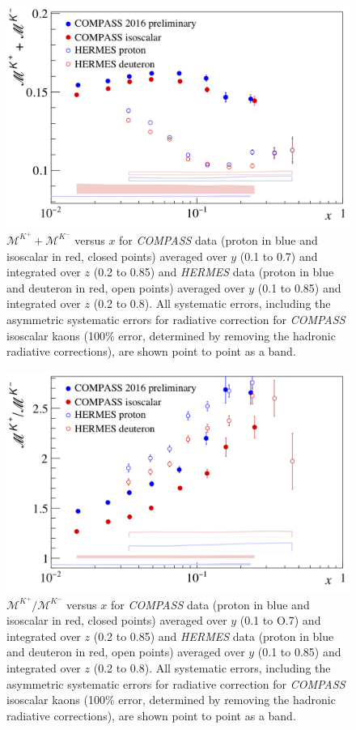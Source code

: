 \documentclass[letterpaper,12pt]{article}
\begin{document}
\begin{figure}[H]
	\centering
	\includegraphics[scale=0.55]{./gfx/Ks.png}
	\caption{$\mathscr{M}^{K^+}+\mathscr{M}^{K^-}$ versus $x$ for \textit{COMPASS} data (proton in blue and isoscalar in red, closed points) averaged over $y$ (0.1 to 0.7) and integrated over $z$ (0.2 to 0.85) and \textit{HERMES} data \cite{HERMES} (proton in blue and deuteron in red, open points) averaged over $y$ (0.1 to 0.85) and integrated over $z$ (0.2 to 0.8). All systematic errors, including the asymmetric systematic errors for radiative correction for \textit{COMPASS} isoscalar kaons (100\% error, determined by removing the hadronic radiative corrections), are shown point to point as a band.}
	\label{Ks}
\end{figure}

\begin{figure}[H]
	\centering
	\includegraphics[scale=0.55]{./gfx/Kr.png}
	\caption{$\mathscr{M}^{K^+}/\mathscr{M}^{K^-}$ versus $x$ for \textit{COMPASS} data (proton in blue and isoscalar in red, closed points) averaged over $y$ (0.1 to O.7) and integrated over $z$ (0.2 to 0.85) and \textit{HERMES} data \cite{HERMES} (proton in blue and deuteron in red, open points) averaged over $y$ (0.1 to 0.85) and integrated over $z$ (0.2 to 0.8). All systematic errors, including the asymmetric systematic errors for radiative correction for \textit{COMPASS} isoscalar kaons (100\% error, determined by removing the hadronic radiative corrections), are shown point to point as a band.}
	\label{Kr}
\end{figure}
\end{document}
